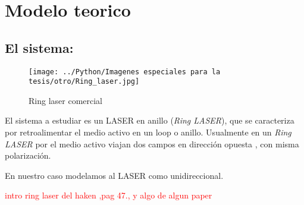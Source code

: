 %
%

\chapter{Modelo teorico}
	\section{El sistema:}
		
		
	\begin{figure}[htp]
		\begin{center}
			\texttt{[image: ../Python/Imagenes especiales para la tesis/otro/Ring\_laser.jpg]}
			\caption{Ring laser comercial}
			\label{fig: real ring laser}
		\end{center}
	\end{figure}	
	
	El sistema a estudiar es un LASER en anillo (\textit{Ring LASER}), que se caracteriza por retroalimentar el medio activo en un loop o anillo.
	Usualmente en un \textit{Ring LASER}  por el medio activo viajan dos campos en dirección opuesta , con misma polarización.
	
	
	
	En nuestro caso modelamos al LASER como unidireccional.
	
	\textcolor{red}{intro ring laser del haken ,pag 47., y algo de algun paper }
	
	
%		
%	


		



%	